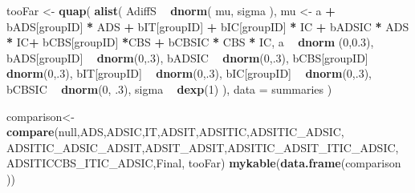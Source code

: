 \documentclass[10pt,dvipsnames,enabledeprecatedfontcommands]{scrartcl}
\newenvironment{Shaded}{\begin{snugshade}}{\end{snugshade}}
\newcommand{\KeywordTok}[1]{\textcolor[rgb]{0.13,0.29,0.53}{\textbf{#1}}}
\newcommand{\DataTypeTok}[1]{\textcolor[rgb]{0.13,0.29,0.53}{#1}}
\newcommand{\DecValTok}[1]{\textcolor[rgb]{0.00,0.00,0.81}{#1}}
\newcommand{\FloatTok}[1]{\textcolor[rgb]{0.00,0.00,0.81}{#1}}
\newcommand{\StringTok}[1]{\textcolor[rgb]{0.31,0.60,0.02}{#1}}
\newcommand{\OperatorTok}[1]{\textcolor[rgb]{0.81,0.36,0.00}{\textbf{#1}}}
\newcommand{\NormalTok}[1]{#1}
\begin{document}
\begin{Shaded}
\begin{Highlighting}[]
\NormalTok{tooFar <-}\StringTok{ }\KeywordTok{quap}\NormalTok{(}
  \KeywordTok{alist}\NormalTok{(}
\NormalTok{    AdiffS }\OperatorTok{~}\StringTok{ }\KeywordTok{dnorm}\NormalTok{( mu, sigma ),}
\NormalTok{    mu <-}\StringTok{ }\NormalTok{a }\OperatorTok{+}\StringTok{ }\NormalTok{bADS[groupID] }\OperatorTok{*}\StringTok{ }\NormalTok{ADS }\OperatorTok{+}\StringTok{  }\NormalTok{bIT[groupID] }\OperatorTok{+}\StringTok{ }\NormalTok{bIC[groupID] }\OperatorTok{*}\StringTok{ }\NormalTok{IC }\OperatorTok{+}\StringTok{ }
\StringTok{      }\NormalTok{bADSIC }\OperatorTok{*}\StringTok{ }\NormalTok{ADS }\OperatorTok{*}\StringTok{ }\NormalTok{IC}\OperatorTok{+}\StringTok{ }\NormalTok{bCBS[groupID] }\OperatorTok{*}\NormalTok{CBS }\OperatorTok{+}\StringTok{ }\NormalTok{bCBSIC }\OperatorTok{*}\StringTok{ }\NormalTok{CBS }\OperatorTok{*}\StringTok{ }\NormalTok{IC, }
\NormalTok{    a }\OperatorTok{~}\StringTok{ }\KeywordTok{dnorm}\NormalTok{ (}\DecValTok{0}\NormalTok{,}\FloatTok{0.3}\NormalTok{),}
\NormalTok{    bADS[groupID] }\OperatorTok{~}\StringTok{ }\KeywordTok{dnorm}\NormalTok{(}\DecValTok{0}\NormalTok{,.}\DecValTok{3}\NormalTok{),}
\NormalTok{    bADSIC }\OperatorTok{~}\StringTok{ }\KeywordTok{dnorm}\NormalTok{(}\DecValTok{0}\NormalTok{,.}\DecValTok{3}\NormalTok{),}
\NormalTok{    bCBS[groupID] }\OperatorTok{~}\StringTok{ }\KeywordTok{dnorm}\NormalTok{(}\DecValTok{0}\NormalTok{,.}\DecValTok{3}\NormalTok{),}
\NormalTok{    bIT[groupID] }\OperatorTok{~}\StringTok{ }\KeywordTok{dnorm}\NormalTok{(}\DecValTok{0}\NormalTok{,.}\DecValTok{3}\NormalTok{),}
\NormalTok{    bIC[groupID] }\OperatorTok{~}\StringTok{ }\KeywordTok{dnorm}\NormalTok{(}\DecValTok{0}\NormalTok{,.}\DecValTok{3}\NormalTok{),}
\NormalTok{     bCBSIC }\OperatorTok{~}\StringTok{ }\KeywordTok{dnorm}\NormalTok{(}\DecValTok{0}\NormalTok{, }\FloatTok{.3}\NormalTok{),}
\NormalTok{    sigma  }\OperatorTok{~}\StringTok{ }\KeywordTok{dexp}\NormalTok{(}\DecValTok{1}\NormalTok{)}
\NormalTok{  ), }
  \DataTypeTok{data =}\NormalTok{ summaries}
\NormalTok{)}
\end{Highlighting}
\end{Shaded}

\normalsize

\vspace{1mm} \footnotesize

\begin{Shaded}
\begin{Highlighting}[]
\NormalTok{comparison<-}\StringTok{ }\KeywordTok{compare}\NormalTok{(null,ADS,ADSIC,IT,ADSIT,ADSITIC,ADSITIC_ADSIC,}
\NormalTok{                     ADSITIC_ADSIC_ADSIT,ADSIT_ADSIT,ADSITIC_ADSIT_ITIC_ADSIC,}
\NormalTok{                     ADSITICCBS_ITIC_ADSIC,Final, tooFar)}
\KeywordTok{mykable}\NormalTok{(}\KeywordTok{data.frame}\NormalTok{(comparison )) }
\end{Highlighting}
\end{Shaded}
\end{document}
